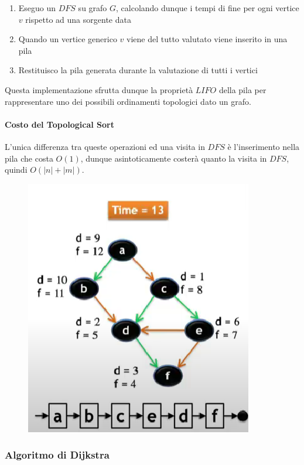 \documentclass{article}
\begin{document}
\begin{enumerate}
    \item Eseguo un $DFS$ su grafo $G$, calcolando dunque i tempi di fine per ogni vertice $v$ rispetto ad una sorgente data
    \item Quando un vertice generico $v$ viene del tutto valutato viene inserito in una pila
    \item Restituisco la pila generata durante la valutazione di tutti i vertici
\end{enumerate}

Questa implementazione sfrutta dunque la proprietà $LIFO$ della pila per rappresentare uno dei possibili ordinamenti topologici dato un grafo.

\paragraph{Costo del Topological Sort} L'unica differenza tra queste operazioni ed una visita in $DFS$ è l'inserimento nella pila che costa $O(1)$, dunque asintoticamente costerà quanto la visita in $DFS$, quindi $O(|n|+|m|)$.

\begin{figure}[htbp]
        \center
        \includegraphics[scale=0.65]{img/ordinamentoTopologico1.png}
    \end{figure}

\newpage

\subsubsection{Algoritmo di Dijkstra}
\end{document}
